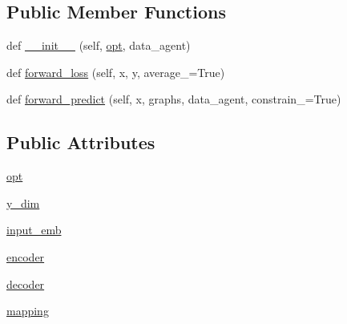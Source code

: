 \subsection*{Public Member Functions}
\begin{DoxyCompactItemize}
\item 
def \hyperlink{classprojects_1_1mastering__the__dungeon_1_1agents_1_1graph__world2_1_1models_1_1Seq2SeqModel_a3e0966c82346420575a1b5d9e1d6dccb}{\+\_\+\+\_\+init\+\_\+\+\_\+} (self, \hyperlink{classprojects_1_1mastering__the__dungeon_1_1agents_1_1graph__world2_1_1models_1_1Seq2SeqModel_ab951839dadb60e2f0c663b7e19de1d7f}{opt}, data\+\_\+agent)
\item 
def \hyperlink{classprojects_1_1mastering__the__dungeon_1_1agents_1_1graph__world2_1_1models_1_1Seq2SeqModel_a643150fe7784a20ac0ed2e76ca9fc10a}{forward\+\_\+loss} (self, x, y, average\+\_\+=True)
\item 
def \hyperlink{classprojects_1_1mastering__the__dungeon_1_1agents_1_1graph__world2_1_1models_1_1Seq2SeqModel_af7293dc5efe834b8f176a5dd2cb7b770}{forward\+\_\+predict} (self, x, graphs, data\+\_\+agent, constrain\+\_\+=True)
\end{DoxyCompactItemize}
\subsection*{Public Attributes}
\begin{DoxyCompactItemize}
\item 
\hyperlink{classprojects_1_1mastering__the__dungeon_1_1agents_1_1graph__world2_1_1models_1_1Seq2SeqModel_ab951839dadb60e2f0c663b7e19de1d7f}{opt}
\item 
\hyperlink{classprojects_1_1mastering__the__dungeon_1_1agents_1_1graph__world2_1_1models_1_1Seq2SeqModel_ae9dc3a7f23b68db8bb940783fc249aa2}{y\+\_\+dim}
\item 
\hyperlink{classprojects_1_1mastering__the__dungeon_1_1agents_1_1graph__world2_1_1models_1_1Seq2SeqModel_ad7d4785d10a5d77b8673d6d94dfe2eb2}{input\+\_\+emb}
\item 
\hyperlink{classprojects_1_1mastering__the__dungeon_1_1agents_1_1graph__world2_1_1models_1_1Seq2SeqModel_ae08d6a7428533435e1dff4e02180cc94}{encoder}
\item 
\hyperlink{classprojects_1_1mastering__the__dungeon_1_1agents_1_1graph__world2_1_1models_1_1Seq2SeqModel_a280544522d6374654857aa5d0a602fe3}{decoder}
\item 
\hyperlink{classprojects_1_1mastering__the__dungeon_1_1agents_1_1graph__world2_1_1models_1_1Seq2SeqModel_ace25f8081c023bc2b5e4a0520c45ad9d}{mapping}
\end{DoxyCompactItemize}


